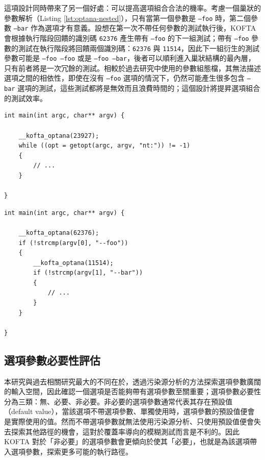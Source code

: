 這項設計同時帶來了另一個好處：可以提高選項組合合法的機率。考慮一個巢狀的參數解析（Listing \ref{lst:optana-nested}），只有當第一個參數是 \texttt{--foo} 時，第二個參數 \texttt{--bar} 作為選項才有意義。設想在第一次不帶任何參數的測試執行後，KOFTA 會根據執行階段回饋的識別碼 \texttt{62376} 產生帶有 \texttt{--foo} 的下一組測試；帶有 \texttt{--foo} 參數的測試在執行階段將回饋兩個識別碼：\texttt{62376} 與 \texttt{11514}，因此下一組衍生的測試參數可能是 \texttt{--foo --foo} 或是 \texttt{--foo --bar}，後者可以順利進入巢狀結構的最內層，只有前者將是一次冗餘的測試。相較於過去研究中使用的參數組態檔，其無法描述選項之間的相依性，即使在沒有 \texttt{--foo} 選項的情況下，仍然可能產生很多包含 \texttt{--bar} 選項的測試，這些測試都將是無效而且浪費時間的；這個設計將提昇選項組合的測試效率。

\vfill

\begin{lstlisting}[caption=選項動態分析插樁範例, label=lst:optana-instrument]
int main(int argc, char** argv) {

    __kofta_optana(23927);
    while ((opt = getopt(argc, argv, "nt:")) != -1)
    {
        // ...
    }

}
\end{lstlisting}

\begin{lstlisting}[caption=巢狀參數解析範例, label=lst:optana-nested]
int main(int argc, char** argv) {

    __kofta_optana(62376);
    if (!strcmp(argv[0], "--foo"))
    {
        __kofta_optana(11514);
        if (!strcmp(argv[1], "--bar"))
        {
            // ...
        }
    }

}
\end{lstlisting}

\subsection{選項參數必要性評估}

本研究與過去相關研究最大的不同在於，透過污染源分析的方法探索選項參數廣闊的輸入空間，因此確認一個選項是否能夠帶有選項參數至關重要；選項參數必要性分為三類：無、必要、非必要。非必要的選項參數通常代表其存在預設值（default value），當該選項不帶選項參數、單獨使用時，選項參數的預設值便會是實際使用的值。然而不帶選項參數就無法使用污染源分析、只使用預設值便會失去探索其他路徑的機會，這對於覆蓋率導向的模糊測試而言是不利的。因此 KOFTA 對於「非必要」的選項參數會更傾向於使其「必要」，也就是為該選項帶入選項參數，探索更多可能的執行路徑。

